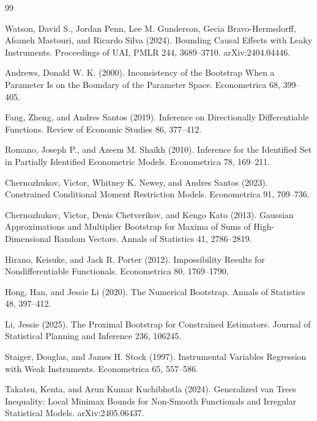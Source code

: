 \documentclass{article}
\begin{document}
\begin{thebibliography}{99}

   Watson, David S., Jordan Penn, Lee M. Gunderson, Gecia Bravo-Hermsdorff, Afsaneh Mastouri, and Ricardo Silva (2024). Bounding Causal Effects with Leaky Instruments. Proceedings of UAI, PMLR 244, 3689--3710. arXiv:2404.04446.

   Andrews, Donald W. K. (2000). Inconsistency of the Bootstrap When a Parameter Is on the Boundary of the Parameter Space. Econometrica 68, 399--405.

   Fang, Zheng, and Andres Santos (2019). Inference on Directionally Differentiable Functions. Review of Economic Studies 86, 377--412.

   Romano, Joseph P., and Azeem M. Shaikh (2010). Inference for the Identified Set in Partially Identified Econometric Models. Econometrica 78, 169--211.

   Chernozhukov, Victor, Whitney K. Newey, and Andres Santos (2023). Constrained Conditional Moment Restriction Models. Econometrica 91, 709--736.

   Chernozhukov, Victor, Denis Chetverikov, and Kengo Kato (2013). Gaussian Approximations and Multiplier Bootstrap for Maxima of Sums of High-Dimensional Random Vectors. Annals of Statistics 41, 2786--2819.

   Hirano, Keisuke, and Jack R. Porter (2012). Impossibility Results for Nondifferentiable Functionals. Econometrica 80, 1769--1790.

   Hong, Han, and Jessie Li (2020). The Numerical Bootstrap. Annals of Statistics 48, 397--412.

   Li, Jessie (2025). The Proximal Bootstrap for Constrained Estimators. Journal of Statistical Planning and Inference 236, 106245.

   Staiger, Douglas, and James H. Stock (1997). Instrumental Variables Regression with Weak Instruments. Econometrica 65, 557--586.

   Takatsu, Kenta, and Arun Kumar Kuchibhotla (2024). Generalized van Trees Inequality: Local Minimax Bounds for Non-Smooth Functionals and Irregular Statistical Models. arXiv:2405.06437.

\end{thebibliography}
\end{document}
